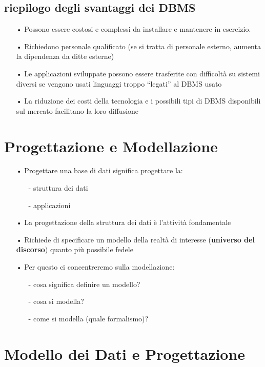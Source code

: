\documentclass[12pt, letterpaper]{article}
\begin{document}
\subsection{riepilogo degli svantaggi dei DBMS}

\begin{itemize}
   \item[•] Possono essere costosi e complessi da installare e mantenere in esercizio.
   \item[•] Richiedono personale qualificato (se si tratta di personale esterno, aumenta la
dipendenza da ditte esterne) 
   \item[•] Le applicazioni sviluppate possono essere trasferite con difficoltà su sistemi diversi
se vengono usati linguaggi troppo “legati” al DBMS usato
   \item[•] La riduzione dei costi della tecnologia e i possibili tipi di DBMS disponibili sul
mercato facilitano la loro diffusione
\end{itemize}

\section{Progettazione e Modellazione}

\begin{itemize}
   \item[•] Progettare una base di dati significa progettare la:
      \begin{itemize}
         \item[-] struttura dei dati
         \item[-] applicazioni
      \end{itemize}
   \item[•] La progettazione della struttura dei dati è l'attività fondamentale
   \item[•] Richiede di specificare un modello della realtà di interesse (\textbf{universo del
   discorso}) quanto più possibile fedele
   \item[•] Per questo ci concentreremo sulla modellazione:
      \begin{itemize}
         \item[-] cosa significa definire un modello?
         \item[-] cosa si modella?
         \item[-] come si modella (quale formalismo)?
      \end{itemize}
\end{itemize}
\newpage
\section{Modello dei Dati e Progettazione}
\end{document}
